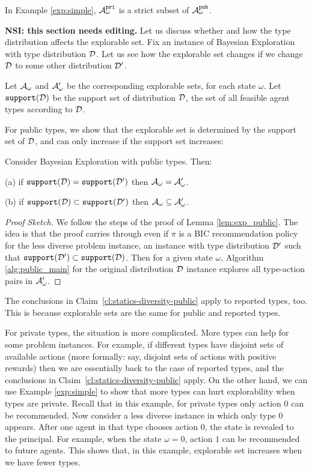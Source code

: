 \begin{claim}
	In Example \ref{exp:simple}, $\mathcal{A}_{\omega}^{\mathtt{pri}}$ is a strict subset of $\mathcal{A}_{\omega}^{\mathtt{pub}}$.
\end{claim}

 {\bf NSI: this section needs editing.}
Let us discuss whether and how the type distribution affects the explorable set. Fix an instance of Bayesian Exploration with type distribution $\mathcal{D}$. Let us see how the explorable set changes if we change $\mathcal{D}$ to some other distribution $\mathcal{D}'$. 

Let $\mathcal{A}_{\omega}$ and $\mathcal{A}_{\omega}'$ be the corresponding explorable sets, for each state $\omega$. Let $\mathtt{support}(\mathcal{D})$ be the support set of distribution $\mathcal{D}$, \ie the set of all feasible agent types according to $\mathcal{D}$.

For public types, we show that the explorable set is determined by the support set of $\mathcal{D}$, and can only increase if the support set increases:

\begin{claim}\label{cl:statics-diversity-public}
Consider Bayesian Exploration with public types. Then:
\begin{OneLiners}
\item[(a)] if $\mathtt{support}(\mathcal{D})=\mathtt{support}(\mathcal{D}')$ then $\mathcal{A}_{\omega}=\mathcal{A}_{\omega}'$.
\item[(b)] if $\mathtt{support}(\mathcal{D})\subset \mathtt{support}(\mathcal{D}')$ then $\mathcal{A}_{\omega}\subseteq \mathcal{A}_{\omega}'$.
\end{OneLiners}
\end{claim}

\begin{proof}[Proof Sketch]
We follow the steps of the proof of Lemma \ref{lem:exp_public}. The idea is that the proof carries through even if $\pi$ is a BIC recommendation policy for the less diverse problem instance, \ie an instance with type distribution $\mathcal{D}'$ such that $\mathtt{support}(\mathcal{D}')\subset \mathtt{support}(\mathcal{D})$. Then for a given state $\omega$, Algorithm \ref{alg:public_main} for the original distribution $\mathcal{D}$ instance explores all type-action pairs in $\mathcal{A}_{\omega}'$.
\end{proof}

The conclusions in Claim~\ref{cl:statics-diversity-public} apply to reported types, too. This is because explorable sets are the same for public and reported types.

For private types, the situation is more complicated. More types can help for some problem instances. For example, if different types have disjoint sets of available actions (more formally: say, disjoint sets of actions with positive rewards) then we are essentially back to the case of reported types, and the conclusions in Claim~\ref{cl:statics-diversity-public} apply. On the other hand, 
we can use Example \ref{exp:simple} to show that more types can hurt explorability when types are private. Recall that in this example, for private types only action 0 can be recommended. Now consider a less diverse instance in which only type 0 appears. After one agent in that type chooses action 0, the state is revealed to the principal. For example, when the state $\omega = 0$, action $1$ can be recommended to future agents. This shows that,  in this example, explorable set increases when we have fewer types. 